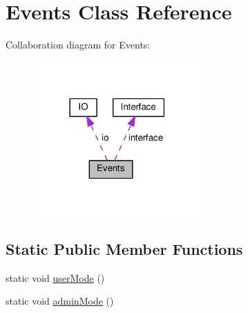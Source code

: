 \hypertarget{classEvents}{}\section{Events Class Reference}
\label{classEvents}


Collaboration diagram for Events\+:
\nopagebreak
\begin{figure}[H]
\begin{center}
\leavevmode
\includegraphics[width=182pt]{classEvents__coll__graph}
\end{center}
\end{figure}
\subsection*{Static Public Member Functions}
\begin{DoxyCompactItemize}
\item 
static void \hyperlink{classEvents_a2fdb7c40bf64aa2e23d3d92dc7ab4d35}{user\+Mode} ()
\item 
static void \hyperlink{classEvents_a2217e32868e367ec8d432ce9db2b450e}{admin\+Mode} ()
\end{DoxyCompactItemize}
